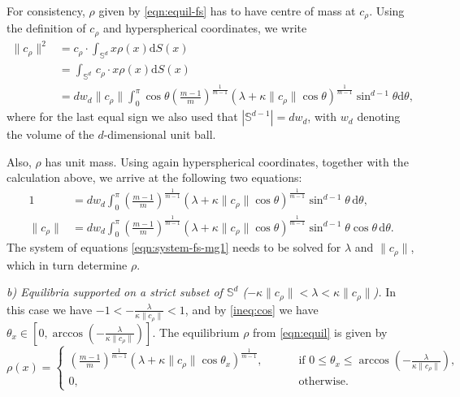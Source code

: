 \documentclass[11pt]{amsart}
\newcommand{\bbs}{\mathbb S}
\def\d{\mathrm{d}}
\newcommand{\dS}{\mathrm{d}S} %
\newcommand{\dm}{d} %
\begin{document}
For consistency, $\rho$ given by \eqref{eqn:equil-fs} has to have centre of mass at $c_\rho$. Using the definition of $c_\rho$ and hyperspherical coordinates, we write
\begin{equation}
\label{eqn:cm-sq}
\begin{aligned}
\|c_\rho\|^2&= c_\rho \cdot\int_{\bbs^\dm}x\rho(x)\dS(x)\\
&= \int_{\bbs^{\dm}}\, c_\rho \cdot x \rho(x)\dS(x)\\
&=\dm w_{\dm}\|c_\rho\|\int_0^\pi \cos\theta \left(\frac{m-1}{m}\right)^{\frac{1}{m-1}}\left(\lambda+\kappa\|c_\rho\|\cos\theta\right)^{\frac{1}{m-1}}\sin^{\dm-1}\theta\d\theta,
\end{aligned}
\end{equation}
where for the last equal sign we also used that $|\bbs^{\dm-1}|=\dm w_{\dm}$, with $w_{\dm}$ denoting the volume of the $\dm$-dimensional unit ball.

Also, $\rho$ has unit mass. Using again hyperspherical coordinates, together with the calculation above, we arrive  at the following two equations: 
\begin{equation}
\label{eqn:system-fs-mg1}
\begin{aligned}
1&=\dm w_\dm\int_0^\pi \left(\frac{m-1}{m}\right)^{\frac{1}{m-1}}\left(\lambda+\kappa\|c_\rho\|\cos\theta\right)^{\frac{1}{m-1}}\sin^{\dm-1}\theta \, \d\theta, \\
\|c_\rho\|& =\dm w_\dm\int_0^\pi \left(\frac{m-1}{m}\right)^{\frac{1}{m-1}}\left(\lambda+\kappa\|c_\rho\|\cos\theta\right)^{\frac{1}{m-1}}\sin^{\dm-1}\theta \cos\theta \, \d\theta.
\end{aligned}
\end{equation}
The system of equations \eqref{eqn:system-fs-mg1} needs to be solved for $\lambda$ and $\|c_\rho\|$, which in turn determine $\rho$.

\medskip

{\em b) Equilibria supported on a strict subset of $\bbs^\dm$ ($-\kappa \|c_\rho\| < \lambda < \kappa \|c_\rho\|$).} In this case we have $-1<-\frac{\lambda}{\kappa\|c_\rho\|}<1$, and by \eqref{ineq:cos} we have $\theta_x \in \left[0,\arccos\left(-\frac{\lambda}{\kappa\|c_\rho\|}\right)\right]$. The equilibrium $\rho$ from \eqref{eqn:equil} is given by
\begin{equation}
\label{eqn:equil-cs}
\rho(x)=\begin{cases}
\left(\frac{m-1}{m}\right)^{\frac{1}{m-1}}\left(\lambda+\kappa\|c_\rho\|\cos\theta_x\right)^{\frac{1}{m-1}},\qquad&\text{ if }0\leq\theta_x\leq \arccos\left(-\frac{\lambda}{\kappa\|c_\rho\|}\right),\\[5pt]
0,\qquad&\text{ otherwise}.
\end{cases}
\end{equation}
\end{document}
